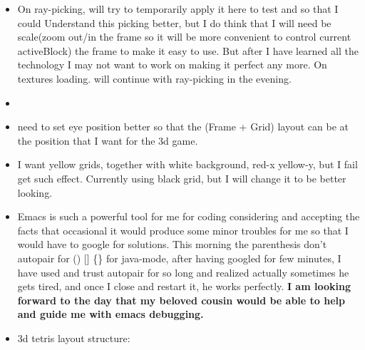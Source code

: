 \documentclass[9pt,b5paper]{article}
\begin{document}
\begin{itemize}
\item On ray-picking, will try to temporarily apply it here to test and so that I could Understand this picking better, but I do think that I will need be scale(zoom out/in the frame so it will be more convenient to control current activeBlock) the frame to make it easy to use. But after I have learned all the technology I may not want to work on making it perfect any more. On textures loading. will continue with ray-picking in the evening.
\item 
\item need to set eye position better so that the (Frame + Grid) layout can be at the position that I want for the 3d game.
\item I want yellow grids, together with white background, red-x yellow-y, but I fail get such effect. Currently using black grid, but I will change it to be better looking.
\item Emacs is such a powerful tool for me for coding considering and accepting the facts that occasional it would produce some minor troubles for me so that I would have to google for solutions. This morning the parenthesis don't autopair for () [] \{\} for java-mode, after having googled for few minutes, I have used and trust autopair for so long and realized actually sometimes he gets tired, and once I close and restart it, he works perfectly. \textbf{I am looking forward to the day that my beloved cousin would be able to help and guide me with emacs debugging.}
\item 3d tetris layout structure:


\end{itemize}
\end{document}
